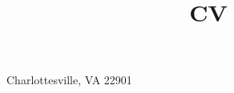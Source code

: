 \usepackage[top=1.2 in,left=1.2 in,right=1.2 in, bottom=1. in]{geometry}

\linespread{1.1}

\title{CV}                               %
\address{728 Regency Ct.}{Charlottesville, VA 22901}%



